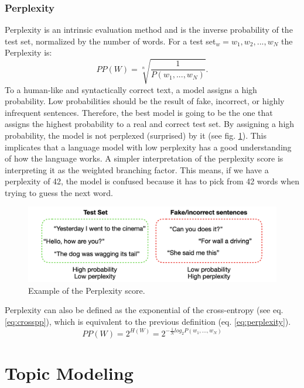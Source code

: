 \subsubsection{Perplexity}\label{sec:perplexity}
Perplexity \cite{perplexity} is an intrinsic evaluation method and is the inverse probability of the test set, normalized by the number of words. For a test set$_w=w_1,w_2,...,w_N$ the Perplexity is:
\begin{equation}
    PP(W)=\sqrt[n]{\frac{1}{P(w_1,...,w_N)}}.
    \label{eq:perplexity}
\end{equation}
To a human-like and syntactically correct text, a model assigns a high probability. Low probabilities should be the result of fake, incorrect, or highly infrequent sentences. Therefore, the best model is going to be the one that assigns the highest probability to a real and correct test set. By assigning a high probability, the model is not perplexed (surprised) by it (see fig. \ref{fig:perplexity}). This implicates that a language model with low perplexity has a good understanding of how the language works. A simpler interpretation of the perplexity score is interpreting it as the weighted branching factor. This means, if we have a perplexity of 42, the model is confused because it has to pick from 42 words when trying to guess the next word. \cite{perplexity}
\begin{figure}[H]
    \centering
    \includegraphics[width=1.0\textwidth]{figures/perplexity_example}
    \caption{Example of the Perplexity score. \cite{perplexity}}
    \label{fig:perplexity}
\end{figure}
Perplexity can also be defined as the exponential of the cross-entropy (see eq. \ref{eq:crosspp}), which is equivalent to the previous definition (eq. \ref{eq:perplexity}).
\begin{equation}
    PP(W)=2^{H(W)}=2^{-\frac{1}{N}log_2 P(w_1,...,w_N)}
\label{eq:crosspp}
\end{equation}

\section{Topic Modeling}
